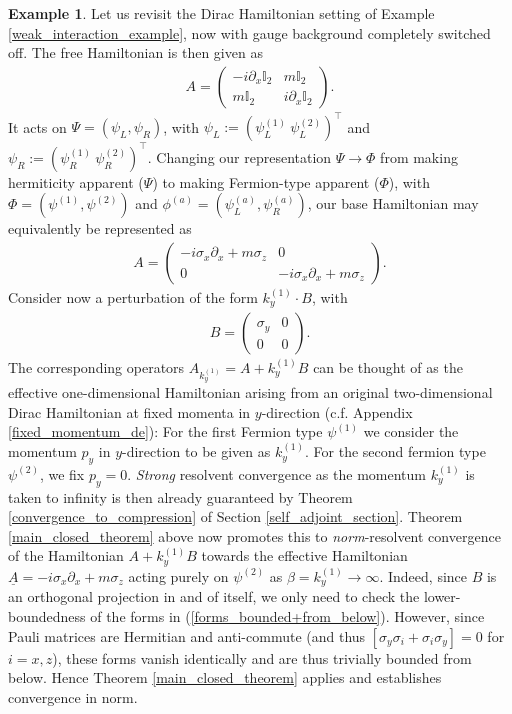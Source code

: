 \documentclass[reqno,12pt,letterpaper]{amsart}
\numberwithin{equation}{section}
\newcommand{\1}{\mathds{1}}
\theoremstyle{definition}
\newtheorem{Ex}[Th]{Example}
\begin{document}
\begin{Ex}\label{high_energy_example_II} Let us revisit the Dirac Hamiltonian setting of Example \ref{weak_interaction_example}, now with gauge background completely switched off. The free Hamiltonian is then given as 
\begin{align}
	A = \begin{pmatrix}
	- i \partial_x  \mathbb{I}_2 & m \mathbb{I}_2 \\
	m \mathbb{I}_2 & i \partial_x  \mathbb{I}_2
\end{pmatrix}.
\end{align}	
It acts on $\Psi = (\psi_L,\psi_R)$, with $
\psi_L := (\psi_L^{(1)} \ \psi_L^{(2)} )^\top $ and $
\psi_R :=( \psi_R^{(1)} \ \psi_R^{(2)})^\top$.
Changing our representation $\Psi \rightarrow \Phi$ from making hermiticity apparent ($\Psi$) to making Fermion-type apparent ($\Phi$), with $\Phi = (\psi^{(1)}, \psi^{(2)})$ and $\phi^{(a)} = (\psi^{(a)}_L, \psi^{(a)}_R)$, our base Hamiltonian may equivalently be represented as 
\begin{align}
	A = \begin{pmatrix}
		- i \sigma_x \partial_x  + m \sigma_z & 0 \\
		0 &- i \sigma_x \partial_x + m \sigma_z
	\end{pmatrix}.
\end{align}	
Consider now a perturbation of the form $k^{(1)}_y \cdot B$, with
\begin{align}
	B = \begin{pmatrix}
		 \sigma_y & 0 \\
		0 &0
	\end{pmatrix}.
\end{align}	
The corresponding operators $A_{k^{(1)}_y} = A + k^{(1)}_y B$ can be thought of as the effective one-dimensional Hamiltonian arising from an original two-dimensional Dirac Hamiltonian at fixed momenta in $y$-direction (c.f. Appendix \ref{fixed_momentum_de}): For the first Fermion type $\psi^{(1)}$ we consider the momentum $p_y$ in $y$-direction to be given as $k^{(1)}_y$. For the second fermion type $\psi^{(2)}$, we fix $p_y = 0$. \emph{Strong} resolvent convergence as the momentum $k^{(1)}_y $ is taken to infinity is then already guaranteed by Theorem \ref{convergence_to_compression} of Section \ref{self_adjoint_section}. Theorem \ref{main_closed_theorem} above now promotes this to \emph{norm}-resolvent convergence of the Hamiltonian $A + k^{(1)}_y B$ towards the effective Hamiltonian $\underline{A} = - i \sigma_x \partial_x + m \sigma_z$ acting purely on $\psi^{(2)}$ as $\beta = k^{(1)}_y \rightarrow \infty$. Indeed, since $B$ is an orthogonal projection in and of itself, we only need to check the lower-boundedness of the forms in (\ref{forms_bounded+from_below}). However, since Pauli matrices are Hermitian and anti-commute (and thus $[\sigma_y \sigma_i + \sigma_i \sigma_y] = 0$ for $i = x,z$), these forms vanish identically and are thus trivially bounded from below. Hence Theorem \ref{main_closed_theorem} applies and establishes convergence in norm.
\end{Ex}	
\end{document}
